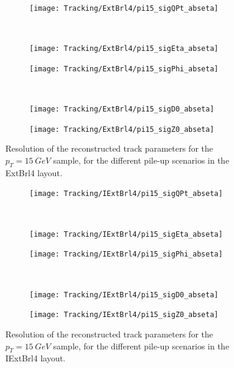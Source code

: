 \documentclass[a4paper,twoside,12pt]{book}
\begin{document}
\begin{figure}
\begin{subfigure}{\linewidth}
\centering
\texttt{[image: Tracking/ExtBrl4/pi15\_sigQPt\_abseta]}
\caption{}
\label{fig:tracking:pi15_sigQPt_abseta_ExtBrl4}
\end{subfigure}\\[1ex]
\begin{subfigure}{.5\linewidth}
\texttt{[image: Tracking/ExtBrl4/pi15\_sigEta\_abseta]}
\caption{}
\label{fig:tracking:pi15_sigEta_abseta_ExtBrl4}
\end{subfigure}
\begin{subfigure}{.5\linewidth}
\texttt{[image: Tracking/ExtBrl4/pi15\_sigPhi\_abseta]}
\caption{}
\label{fig:tracking:pi15_sigPhi_abseta_ExtBrl4}
\end{subfigure}\\[1ex]
\begin{subfigure}{.5\linewidth}
\texttt{[image: Tracking/ExtBrl4/pi15\_sigD0\_abseta]}
\caption{}
\label{fig:tracking:pi15_sigD0_abseta_ExtBrl4}
\end{subfigure}
\begin{subfigure}{.5\linewidth}
\texttt{[image: Tracking/ExtBrl4/pi15\_sigZ0\_abseta]}
\caption{}
\label{fig:tracking:pi15_sigZ0_abseta_ExtBrl4}
\end{subfigure}
\caption{Resolution of the reconstructed track parameters for the $p_{T} = 15\ GeV$ sample, for the different pile-up scenarios in the ExtBrl4 layout.}
\label{fig:tracking:resolutionPileup_ExtBrl4}
\end{figure}

\begin{figure}
\begin{subfigure}{\linewidth}
\centering
\texttt{[image: Tracking/IExtBrl4/pi15\_sigQPt\_abseta]}
\caption{}
\label{fig:tracking:pi15_sigQPt_abseta_IExtBrl4}
\end{subfigure}\\[1ex]
\begin{subfigure}{.5\linewidth}
\texttt{[image: Tracking/IExtBrl4/pi15\_sigEta\_abseta]}
\caption{}
\label{fig:tracking:pi15_sigEta_abseta_IExtBrl4}
\end{subfigure}
\begin{subfigure}{.5\linewidth}
\texttt{[image: Tracking/IExtBrl4/pi15\_sigPhi\_abseta]}
\caption{}
\label{fig:tracking:pi15_sigPhi_abseta_IExtBrl4}
\end{subfigure}\\[1ex]
\begin{subfigure}{.5\linewidth}
\texttt{[image: Tracking/IExtBrl4/pi15\_sigD0\_abseta]}
\caption{}
\label{fig:tracking:pi15_sigD0_abseta_IExtBrl4}
\end{subfigure}
\begin{subfigure}{.5\linewidth}
\texttt{[image: Tracking/IExtBrl4/pi15\_sigZ0\_abseta]}
\caption{}
\label{fig:tracking:pi15_sigZ0_abseta_IExtBrl4}
\end{subfigure}
\caption{Resolution of the reconstructed track parameters for the $p_{T} = 15\ GeV$ sample, for the different pile-up scenarios in the IExtBrl4 layout.}
\label{fig:tracking:resolutionPileup_IExtBrl4}
\end{figure}
\end{document}
